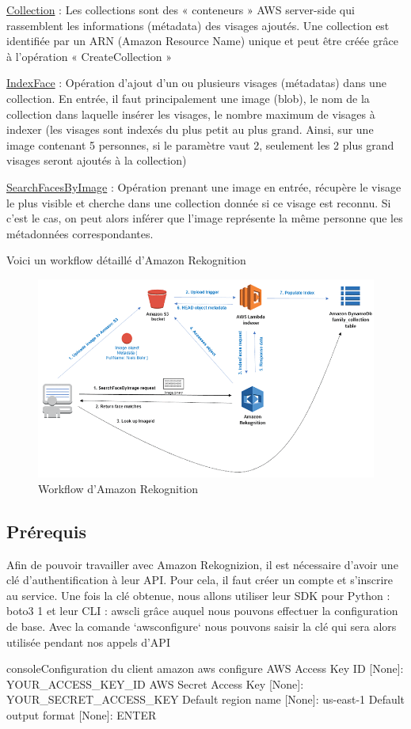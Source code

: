 \underline{Collection} : Les collections sont des « conteneurs » AWS server-side qui rassemblent les informations (métadata)
des visages ajoutés. Une collection est identifiée par un ARN (Amazon Resource Name) unique et peut être créée
grâce à l’opération « CreateCollection »

\underline{IndexFace} : Opération d’ajout d’un ou plusieurs visages (métadatas) dans une collection. En entrée, il faut
principalement une image (blob), le nom de la collection dans laquelle insérer les visages, le nombre maximum de
visages à indexer (les visages sont indexés du plus petit au plus grand. Ainsi, sur une image contenant 5 personnes,
si le paramètre vaut 2, seulement les 2 plus grand visages seront ajoutés à la collection)

\underline{SearchFacesByImage} : Opération prenant une image en entrée, récupère le visage le plus visible et cherche dans
une collection donnée si ce visage est reconnu. Si c’est le cas, on peut alors inférer que l’image représente la même
personne que les métadonnées correspondantes.

Voici un workflow détaillé d’Amazon Rekognition

\begin{figure}[H]
	\centering
	\includegraphics[width=12cm]{images/proto-6.png}
	\caption{Workflow d'Amazon Rekognition}
	\label{fig:reko-workflow}
\end{figure}

\subsection{Prérequis}

Afin de pouvoir travailler avec Amazon Rekognizion, il est nécessaire d’avoir une clé d’authentification à leur API.
Pour cela, il faut créer un compte et s’inscrire au service. Une fois la clé obtenue, nous allons utiliser leur SDK pour
Python : boto3 1 et leur CLI : awscli grâce auquel nous pouvons effectuer la configuration de base.
Avec la comande `awsconfigure` nous pouvons saisir la clé qui sera alors utilisée pendant nos appels d’API

\begin{listingsbox}{console}{Configuration du client amazon}
aws configure
AWS Access Key ID [None]:  YOUR_ACCESS_KEY_ID
AWS Secret Access Key [None]: YOUR_SECRET_ACCESS_KEY
Default region name [None]: us-east-1
Default output format [None]: ENTER
\end{listingsbox}
